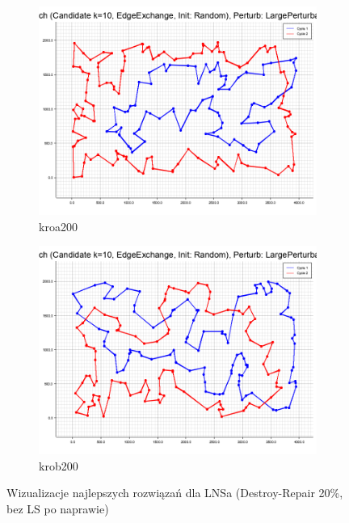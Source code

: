 \documentclass[12pt,a4paper]{article}
\begin{document}
\begin{figure}[H]
\begin{adjustwidth}{-1cm}{-1cm}
    \centering
    \begin{subfigure}[b]{0.5\textwidth}
        \centering
        \includegraphics[width=\textwidth]{figures/kroa200_LNSa_no_LS_after_repair__Base_Local_Search_Candidate_k_10_EdgeExchange_Init_Random__Perturb_LargePerturbation_destroy_0_20__LS_on_Initial_.png}
        \caption{kroa200}
    \end{subfigure}%
    \hfill
    \begin{subfigure}[b]{0.5\textwidth}
        \centering
        \includegraphics[width=\textwidth]{figures/krob200_LNSa_no_LS_after_repair__Base_Local_Search_Candidate_k_10_EdgeExchange_Init_Random__Perturb_LargePerturbation_destroy_0_20__LS_on_Initial_.png}
        \caption{krob200}
    \end{subfigure}
    \caption{Wizualizacje najlepszych rozwiązań dla LNSa (Destroy-Repair 20\%, bez LS po naprawie)}
    \label{fig:lnsa}
\end{adjustwidth}
\end{figure}
\end{document}
